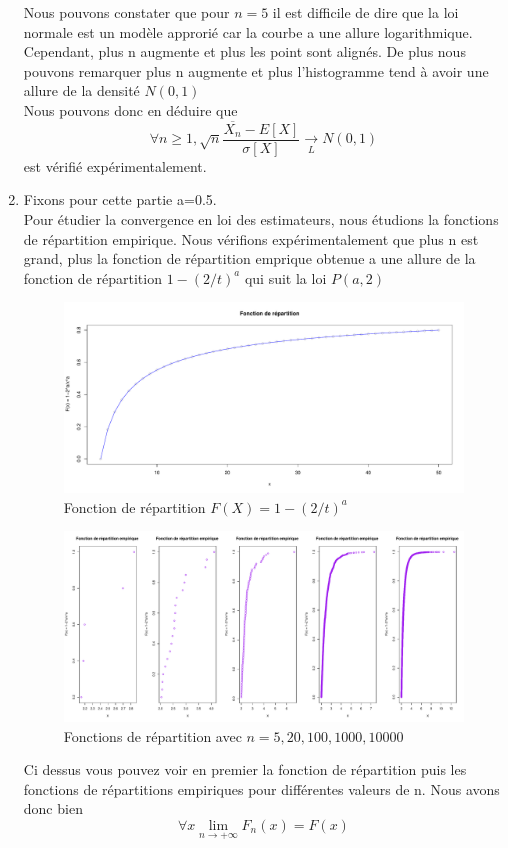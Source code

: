 \documentclass[12pt]{article}
\begin{document}
\begin{enumerate}
Nous pouvons constater que pour $n=5$ il est difficile de dire que la loi normale est un mod\`{e}le approri\'{e} car la courbe a une allure logarithmique. Cependant, plus n augmente et plus les point sont align\'{e}s.  De plus nous pouvons remarquer plus n augmente et plus l'histogramme tend \`{a} avoir une allure de la densit\'{e} $ N(0,1) $
\\ 
Nous pouvons donc en d\'{e}duire que $$\forall n\geq 1, \sqrt{n} \frac{\overline{X_{n}}-E[X]}{\sigma[X]}\underset{L}{\longrightarrow} N(0,1)$$ est v\'{e}rifi\'{e} exp\'{e}rimentalement.
\\

\item
Fixons pour cette partie a=0.5.
\\
Pour \'{e}tudier la convergence en loi des estimateurs, nous \'{e}tudions la fonctions de r\'{e}partition empirique. Nous v\'{e}rifions exp\'{e}rimentalement que plus n est grand, plus la fonction de r\'{e}partition emprique obtenue a une allure de la fonction de r\'{e}partition $ 1 - (2/t)^a$ qui suit la loi $P(a,2)$
\\
\begin{figure}[H]
\centering
\includegraphics[width=1.0\textwidth]{figures/GraphP2Q61.pdf}
\caption{Fonction de r\'{e}partition $ F(X) = 1 - (2/t)^a$}
\end{figure}

\begin{figure}[H]
\centering
\includegraphics[width=1.0\textwidth]{figures/GraphP2Q62.pdf}
\caption{Fonctions de  r\'{e}partition avec $n=5, 20, 100, 1000, 10000$ }
\end{figure}

Ci dessus vous pouvez voir en premier la fonction de r\'{e}partition puis les fonctions de r\'{e}partitions empiriques pour diff\'{e}rentes valeurs de n. Nous avons donc bien $$\forall x \lim_{n \to +\infty} F_n(x) = F(x) $$



\end{enumerate}

\end{document}

